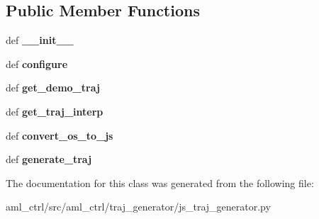 \subsection*{Public Member Functions}
\begin{DoxyCompactItemize}
\item 
\hypertarget{classaml__ctrl_1_1traj__generator_1_1js__traj__generator_1_1_j_s_traj_generator_a838acbd8e78f32a5655353b2161d27ab}{def {\bfseries \-\_\-\-\_\-init\-\_\-\-\_\-}}\label{classaml__ctrl_1_1traj__generator_1_1js__traj__generator_1_1_j_s_traj_generator_a838acbd8e78f32a5655353b2161d27ab}

\item 
\hypertarget{classaml__ctrl_1_1traj__generator_1_1js__traj__generator_1_1_j_s_traj_generator_a01f5ddbc5fdda8ea6b8f8d4eda5cbd35}{def {\bfseries configure}}\label{classaml__ctrl_1_1traj__generator_1_1js__traj__generator_1_1_j_s_traj_generator_a01f5ddbc5fdda8ea6b8f8d4eda5cbd35}

\item 
\hypertarget{classaml__ctrl_1_1traj__generator_1_1js__traj__generator_1_1_j_s_traj_generator_ad718596c2d6e24340b478740ecf1c7f8}{def {\bfseries get\-\_\-demo\-\_\-traj}}\label{classaml__ctrl_1_1traj__generator_1_1js__traj__generator_1_1_j_s_traj_generator_ad718596c2d6e24340b478740ecf1c7f8}

\item 
\hypertarget{classaml__ctrl_1_1traj__generator_1_1js__traj__generator_1_1_j_s_traj_generator_a3ae8aaad79f355fd7c736cafc3d63cc8}{def {\bfseries get\-\_\-traj\-\_\-interp}}\label{classaml__ctrl_1_1traj__generator_1_1js__traj__generator_1_1_j_s_traj_generator_a3ae8aaad79f355fd7c736cafc3d63cc8}

\item 
\hypertarget{classaml__ctrl_1_1traj__generator_1_1js__traj__generator_1_1_j_s_traj_generator_af733d0fba6d5042ad72f30efd183b8c5}{def {\bfseries convert\-\_\-os\-\_\-to\-\_\-js}}\label{classaml__ctrl_1_1traj__generator_1_1js__traj__generator_1_1_j_s_traj_generator_af733d0fba6d5042ad72f30efd183b8c5}

\item 
\hypertarget{classaml__ctrl_1_1traj__generator_1_1js__traj__generator_1_1_j_s_traj_generator_a418d27b1283d1845d8245e630741a2aa}{def {\bfseries generate\-\_\-traj}}\label{classaml__ctrl_1_1traj__generator_1_1js__traj__generator_1_1_j_s_traj_generator_a418d27b1283d1845d8245e630741a2aa}

\end{DoxyCompactItemize}


The documentation for this class was generated from the following file\-:\begin{DoxyCompactItemize}
\item 
aml\-\_\-ctrl/src/aml\-\_\-ctrl/traj\-\_\-generator/js\-\_\-traj\-\_\-generator.\-py\end{DoxyCompactItemize}
